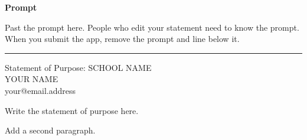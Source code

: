 \documentclass[11pt]{article}
\begin{document}
	
\textbf{Prompt}

Past the prompt here. People who edit your statement need to know the prompt. When you submit the app, remove the prompt and line below it.

\noindent\rule{\textwidth}{1pt}

\begin{center}
{\Large Statement of Purpose: SCHOOL NAME} \\ [0.3cm]
{\large YOUR NAME} \\
{your@email.address}
\end{center}

Write the statement of purpose here.

Add a second paragraph.
\end{document}
